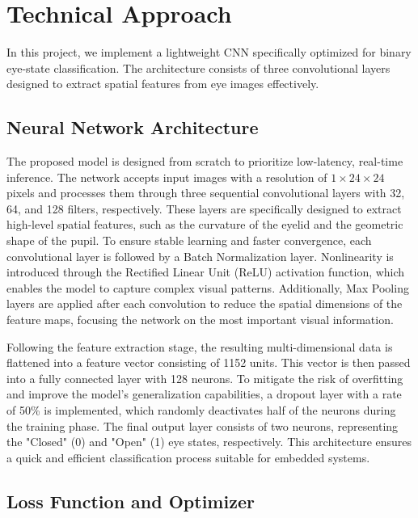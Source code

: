 \documentclass[10pt,twocolumn,letterpaper]{article}
\begin{document}
\section{Technical Approach}

In this project, we implement a lightweight CNN specifically optimized for binary eye-state classification. 
The architecture consists of three convolutional layers designed to extract spatial features from eye images effectively.

\subsection{Neural Network Architecture}

The proposed model is designed from scratch to prioritize low-latency, real-time inference. The network accepts input images with a resolution of $1 \times 24 \times 24$ pixels and processes them through three sequential convolutional layers with 32, 64, and 128 filters, respectively. 
These layers are specifically designed to extract high-level spatial features, such as the curvature of the eyelid and the geometric shape of the pupil. To ensure stable learning and faster convergence, each convolutional layer is followed by a Batch Normalization layer. 
Nonlinearity is introduced through the Rectified Linear Unit (ReLU) activation function, which enables the model to capture complex visual patterns. Additionally, Max Pooling layers are applied after each convolution to reduce the spatial dimensions of the feature maps, focusing the network on the most important visual information.

Following the feature extraction stage, the resulting multi-dimensional data is flattened into a feature vector consisting of 1152 units. 
This vector is then passed into a fully connected layer with 128 neurons. To mitigate the risk of overfitting and improve the model's generalization capabilities, a dropout layer with a rate of 50\% is implemented, which randomly deactivates half of the neurons during the training phase. 
The final output layer consists of two neurons, representing the "Closed" (0) and "Open" (1) eye states, respectively. 
This architecture ensures a quick and efficient classification process suitable for embedded systems.

\subsection{Loss Function and Optimizer}
\end{document}
